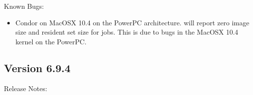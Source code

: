 \noindent Known Bugs:

\begin{itemize}

\item Condor on MacOSX 10.4 on the PowerPC architecture.
will report zero image size and resident set size for jobs. This
is due to bugs in the MacOSX 10.4 kernel on the PowerPC.

\end{itemize}


\subsection*{\label{sec:New-6-9-4}Version 6.9.4}

\noindent Release Notes:

